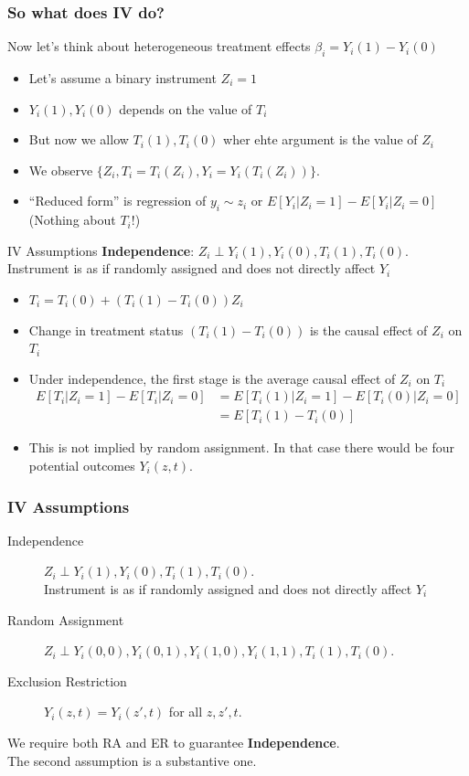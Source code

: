 \documentclass[xcolor=pdftex,dvipsnames,table,mathserif,aspectratio=169]{beamer}
\begin{document}
\begin{frame}
\frametitle{So what does IV do?}
Now let's think about \alert{heterogeneous treatment effects} $\beta_i = Y_i(1) - Y_i(0)$
\begin{itemize}
\item Let's assume a binary instrument $Z_i=1$
\item $Y_i(1),Y_i(0)$ depends on the value of $T_i$
\item But now we allow $T_i(1),T_i(0)$ wher ehte argument is the value of $Z_i$
\item We observe $\{Z_i, T_i = T_i(Z_i), Y_i = Y_i(T_i(Z_i))\}$.
\item ``Reduced form'' is regression of $y_i \sim z_i$ or $E[Y_i | Z_i =1] - E[Y_i | Z_i =0]$\\
(Nothing about $T_i$!)
\end{itemize}
\end{frame}

\begin{frame}{IV Assumptions}
\textbf{Independence}: $Z_i \perp Y_i(1), Y_i(0), T_i(1), T_i(0)$. Instrument is as if randomly assigned and does not directly affect $Y_i$
\begin{itemize}
\item $T_i = T_i(0) + (T_i(1) - T_i(0)) Z_i$
\item Change in treatment status $(T_i(1) - T_i(0))$ is the causal effect of $Z_i$ on $T_i$
\item Under independence, the \alert{first stage} is the average causal effect of $Z_i$ on $T_i$
\begin{align*}
E[T_i | Z_i = 1] - E[T_i | Z_i = 0] 
&= E[T_i(1) | Z_i = 1] - E[T_i(0) | Z_i = 0]\\
&= E[T_i(1)-T_i(0)]
\end{align*}
\item This is not implied by random assignment. In that case there would be four potential outcomes $Y_i(z,t)$.
\end{itemize}
\end{frame}

\begin{frame}
\frametitle{IV Assumptions}
\begin{description}
\item [Independence] $Z_i \perp Y_i(1), Y_i(0), T_i(1), T_i(0)$.\\
 Instrument is as if randomly assigned and does not directly affect $Y_i$
\item [Random Assignment] $Z_i \perp Y_i(0,0), Y_i(0,1), Y_i(1,0), Y_i(1,1), T_i(1), T_i(0)$. 
\item [Exclusion Restriction] $Y_i(z,t) = Y_i(z',t)$ for all $z,z',t$. 
\end{description}
We require \alert{both RA and ER} to guarantee \textbf{Independence}.\\
The second assumption is a substantive one.
\end{frame}
\end{document}
